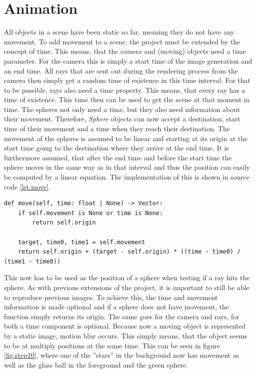 \documentclass[12pt]{report}
\begin{document}
\chapter{Animation}
All objects in a scene have been static so far, meaning they do not have any movement. To add movement to a scene, the project must be extended by the concept of time. This means, that the camera and (moving) objects need a time parameter. For the camera this is simply a start time of the image generation and an end time. All rays that are sent out during the rendering process from the camera then simply get a random time of existence in this time interval. For that to be possible, rays also need a time property. This means, that every ray has a time of existence. This time then can be used to get the scene at that moment in time. The spheres not only need a time, but they also need information about their movement. Therefore, \textit{Sphere} objects can now accept a destination, start time of their movement and a time when they reach their destination. The movement of the spheres is assumed to be linear and starting at its origin at the start time going to the destination where they arrive at the end time. It is furthermore assumed, that after the end time and before the start time the sphere moves in the same way as in that interval and thus the position can easily be computed by a linear equation. The implementation of this is shown in source code \ref{lst:move}.
\begin{lstlisting}[caption={Computing position of sphere}, label=lst:move, style=mystyle]
def move(self, time: float | None) -> Vector:
    if self.movement is None or time is None:
        return self.origin
        
    target, time0, time1 = self.movement
    return self.origin + (target - self.origin) * ((time - time0) / (time1 - time0))
\end{lstlisting}
This now has to be used as the position of a sphere when testing if a ray hits the sphere. As with previous extensions of the project, it is important to still be able to reproduce previous images. To achieve this, the time and movement information is made optional and if a sphere does not have movement, the function simply returns its origin. The same goes for the camera and rays, for both a time component is optional. Because now a moving object is represented by a static image, motion blur occurs. This simply means, that the object seems to be at multiply positions at the same time. This can be seen in figure \ref{fig:step10}, where one of the ''stars'' in the background now has movement as well as the glass ball in the foreground and the green sphere.
\end{document}
